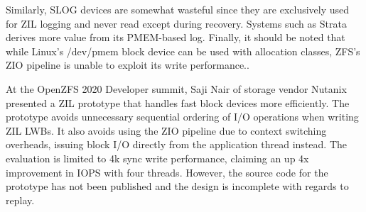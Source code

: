 \documentclass[12pt,a4paper,twoside]{book}
\begin{document}
Similarly, SLOG devices are somewhat wasteful since they are exclusively used for ZIL logging and never read except during recovery.
Systems such as Strata derives more value from its PMEM-based log.
Finally, it should be noted that while Linux's /dev/pmem block device can be used with allocation classes, ZFS's ZIO pipeline is unable to exploit its write performance..

At the OpenZFS 2020 Developer summit, Saji Nair of storage vendor Nutanix presented a ZIL prototype that handles fast block devices more efficiently.
The prototype avoids unnecessary sequential ordering of I/O operations when writing ZIL LWBs.
It also avoids using the ZIO pipeline due to context switching overheads, issuing block I/O directly from the application thread instead.
The evaluation is limited to 4k sync write performance, claiming an up 4x improvement in IOPS with four threads.
However, the source code for the prototype has not been published and the design is incomplete with regards to replay.
\end{document}
